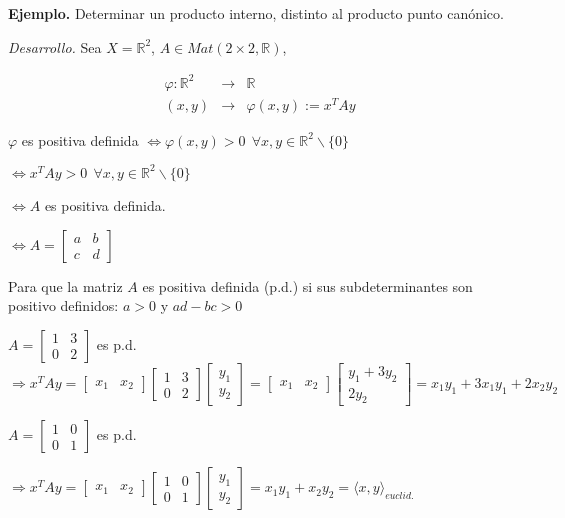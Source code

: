\documentclass[12pt]{article}
\begin{document}
\textbf{Ejemplo.} Determinar un producto interno, distinto al producto punto canónico.

\emph{Desarrollo.} Sea $X=\mathbb{R}^2$, $A \in Mat(2\times 2, \mathbb{R})$,

\begin{eqnarray*}
\varphi: \mathbb{R}^2  &\rightarrow & \mathbb{R} \\
  (x,y)&\rightarrow & \varphi(x,y) := x^{T}Ay
\end{eqnarray*}

$\varphi$ es positiva definida $\Leftrightarrow \varphi(x,y) > 0 \ \ \forall x, y \in \mathbb{R}^2 \backslash \{0\}$

$\Leftrightarrow x^{T}Ay > 0 \ \ \forall x,y \in \mathbb{R}^2 \backslash \{0\}$

$\Leftrightarrow A$ es positiva definida.

$\Leftrightarrow A=\begin{bmatrix} a & b \\ c & d\end{bmatrix}$


Para que la matriz $A$ es positiva definida (p.d.) si sus subdeterminantes son positivo definidos:  $a>0$ y $ad-bc > 0$

$A=\begin{bmatrix} 1 & 3 \\ 0 & 2 \end{bmatrix}$ es p.d. $\Rightarrow x^{T}Ay = \begin{bmatrix} x_1 & x_2\end{bmatrix}\begin{bmatrix} 1 & 3 \\ 0 & 2 \end{bmatrix} \begin{bmatrix} y_1 \\ y_2 \end{bmatrix} = \begin{bmatrix} x_1 & x_2\end{bmatrix} \begin{bmatrix} y_1 + 3y_2 \\ 2 y_2 \end{bmatrix} = x_1y_1 + 3x_1 y_1 + 2 x_2 y_2$ 


$A=\begin{bmatrix} 1 & 0 \\ 0 & 1 \end{bmatrix}$ es p.d.

$\Rightarrow x^{T}Ay = \begin{bmatrix} x_1 & x_2\end{bmatrix}\begin{bmatrix} 1 & 0 \\ 0 & 1 \end{bmatrix} \begin{bmatrix} y_1 \\ y_2 \end{bmatrix} = x_1 y_1 + x_2 y_2 = \langle x ,  y \rangle_{euclid.}$ 
\end{document}
